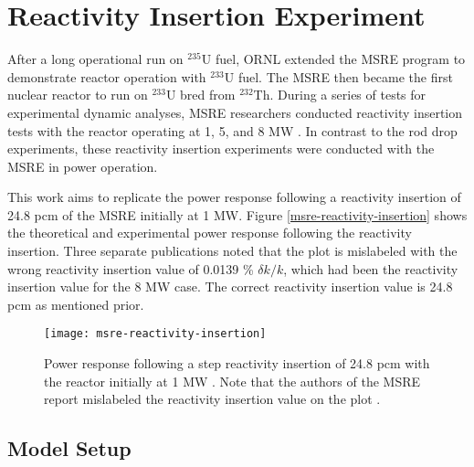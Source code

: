 \section{Reactivity Insertion Experiment} \label{sec:reactivity-insertion}

After a long operational run on $^{235}$U fuel, \gls{ORNL} extended the \gls{MSRE} program to
demonstrate reactor operation with $^{233}$U fuel. The \gls{MSRE} then became the first nuclear
reactor to run on $^{233}$U bred from $^{232}$Th. During a series of tests for experimental
dynamic analyses, \gls{MSRE} researchers conducted reactivity insertion tests with the reactor
operating at 1, 5, and 8 MW \cite{steffy_experimental_1970}.
In contrast to the rod drop experiments, these reactivity insertion
experiments were conducted with the \gls{MSRE} in power operation.

This work aims to replicate the power response following a reactivity insertion of 24.8 pcm of the
\gls{MSRE} initially at 1 MW. Figure \ref{msre-reactivity-insertion} shows the theoretical and
experimental power response following the reactivity insertion. Three separate publications
\cite{zanetti_innovative_2015, singh_study_2019, mochizuki_validation_2022} noted that the plot is
mislabeled with the wrong reactivity insertion value of 0.0139 \% $\delta k/k$, which had been the
reactivity insertion value for the 8 MW case. The correct reactivity insertion value is 24.8 pcm as
mentioned prior.

\begin{figure}[t]
  \centering
  \texttt{[image: msre-reactivity-insertion]}
  \caption{Power response following a step reactivity insertion of 24.8 pcm with the reactor
    initially at 1 MW \cite{steffy_experimental_1970}. Note that the authors of the \gls{MSRE}
    report mislabeled the reactivity insertion value on the plot
  \cite{zanetti_innovative_2015, singh_study_2019, mochizuki_validation_2022}.}
  \label{fig:msre-reactivity-insertion}
\end{figure}

\subsection{Model Setup}

